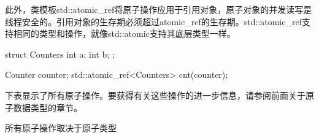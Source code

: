 
此外，类模板std::atomic\_ref将原子操作应用于引用对象，原子对象的并发读写是线程安全的。引用对象的生存期必须超过atomic\_ref的生存期。std::atomic\_ref支持相同的类型和操作，就像std::atomic支持其底层类型一样。

\begin{cpp}
struct Counters {
	int a;
	int b;
};

Counter counter;
std::atomic_ref<Counters> cnt(counter);
\end{cpp}


下表显示了所有原子操作。要获得有关这些操作的进一步信息，请参阅前面关于原子数据类型的章节。

\begin{center}
所有原子操作取决于原子类型
\end{center}

